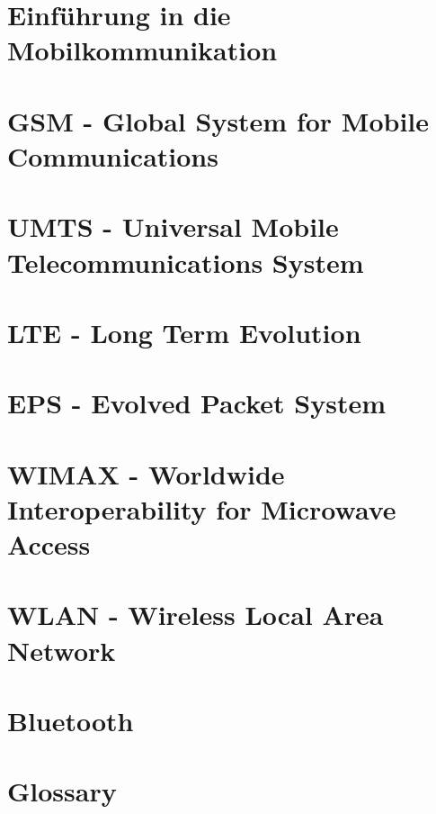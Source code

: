 \documentclass[10pt,twoside,a4paper,fleqn]{article}
\begin{document}
\begin{titlepage}
	\maketitle

	\vspace{100mm}

	\thispagestyle{empty} %
\end{titlepage}
\setcounter{tocdepth}{2}
\tableofcontents 

\newpage

\section{Einführung in die Mobilkommunikation}

\section{GSM - Global System for Mobile Communications}

\section{UMTS - Universal Mobile Telecommunications System}

\section{LTE - Long Term Evolution}


\section{EPS - Evolved Packet System}

\section{WIMAX - Worldwide Interoperability for Microwave Access}

\section{WLAN - Wireless Local Area Network}

\section{Bluetooth}

\newpage
\appendix
\section{Glossary}

\end{document}
